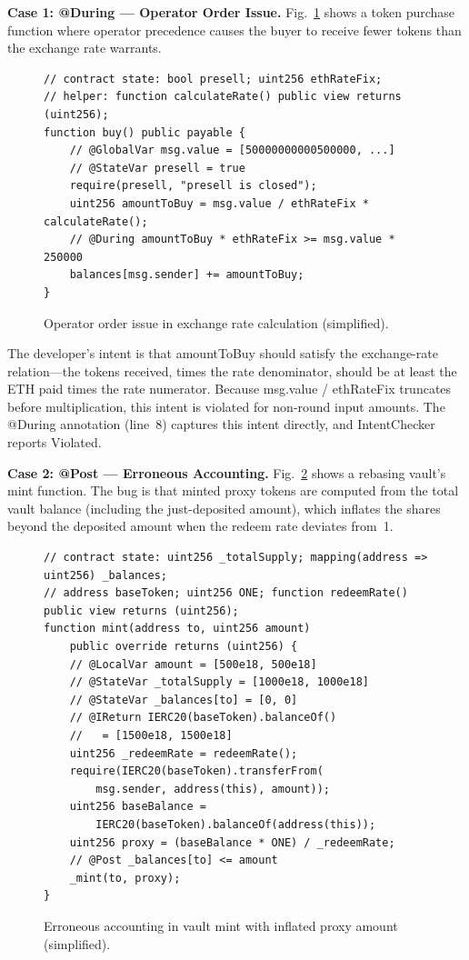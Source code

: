 \documentclass[pdflatex,sn-basic]{sn-jnl}%
\theoremstyle{thmstyleone}%
\theoremstyle{thmstyletwo}%
\theoremstyle{thmstylethree}%
\begin{document}
\smallskip
\noindent\textbf{Case 1: @During --- Operator Order Issue.}
Fig.~\ref{fig:operator-order-example} shows a token purchase function where operator precedence causes the buyer to receive fewer tokens than the exchange rate warrants.

\begin{figure}[t]
\begin{lstlisting}
// contract state: bool presell; uint256 ethRateFix;
// helper: function calculateRate() public view returns (uint256);
function buy() public payable {
    // @GlobalVar msg.value = [50000000000500000, ...]
    // @StateVar presell = true
    require(presell, "presell is closed");
    uint256 amountToBuy = msg.value / ethRateFix * calculateRate();
    // @During amountToBuy * ethRateFix >= msg.value * 250000
    balances[msg.sender] += amountToBuy;
}
\end{lstlisting}
\caption{Operator order issue in exchange rate calculation (simplified).}
\label{fig:operator-order-example}
\end{figure}

The developer's intent is that amountToBuy should satisfy the exchange-rate relation---the tokens received, times the rate denominator, should be at least the ETH paid times the rate numerator.
Because msg.value / ethRateFix truncates before multiplication, this intent is violated for non-round input amounts.
The @During annotation (line~8) captures this intent directly, and IntentChecker reports Violated.

\smallskip
\noindent\textbf{Case 2: @Post --- Erroneous Accounting.}
Fig.~\ref{fig:erroneous-accounting-example} shows a rebasing vault's mint function.
The bug is that minted proxy tokens are computed from the total vault balance (including the just-deposited amount), which inflates the shares beyond the deposited amount when the redeem rate deviates from~1.

\begin{figure}[t]
\begin{lstlisting}
// contract state: uint256 _totalSupply; mapping(address => uint256) _balances;
// address baseToken; uint256 ONE; function redeemRate() public view returns (uint256);
function mint(address to, uint256 amount)
    public override returns (uint256) {
    // @LocalVar amount = [500e18, 500e18]
    // @StateVar _totalSupply = [1000e18, 1000e18]
    // @StateVar _balances[to] = [0, 0]
    // @IReturn IERC20(baseToken).balanceOf()
    //   = [1500e18, 1500e18]
    uint256 _redeemRate = redeemRate();
    require(IERC20(baseToken).transferFrom(
        msg.sender, address(this), amount));
    uint256 baseBalance =
        IERC20(baseToken).balanceOf(address(this));
    uint256 proxy = (baseBalance * ONE) / _redeemRate;
    // @Post _balances[to] <= amount
    _mint(to, proxy);
}
\end{lstlisting}
\caption{Erroneous accounting in vault mint with inflated proxy amount (simplified).}
\label{fig:erroneous-accounting-example}
\end{figure}
\end{document}

